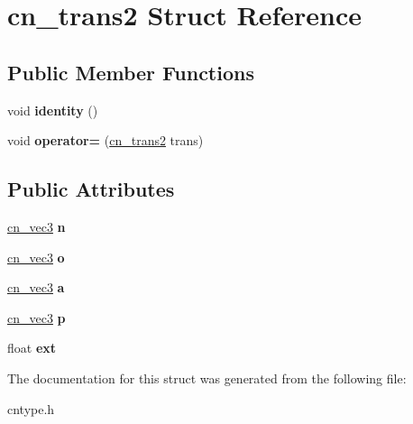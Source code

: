 \hypertarget{structcn__trans2}{\section{cn\-\_\-trans2 Struct Reference}
\label{structcn__trans2}
}
\subsection*{Public Member Functions}
\begin{DoxyCompactItemize}
\item 
\hypertarget{structcn__trans2_ab430e375eb0aa644ee7a2141deb4fdf3}{void {\bfseries identity} ()}\label{structcn__trans2_ab430e375eb0aa644ee7a2141deb4fdf3}

\item 
\hypertarget{structcn__trans2_a439c9767d8c3ece2bd5c3e2d0c3a66d1}{void {\bfseries operator=} (\hyperlink{structcn__trans2}{cn\-\_\-trans2} trans)}\label{structcn__trans2_a439c9767d8c3ece2bd5c3e2d0c3a66d1}

\end{DoxyCompactItemize}
\subsection*{Public Attributes}
\begin{DoxyCompactItemize}
\item 
\hypertarget{structcn__trans2_aab9125633d13ba361184f716a1a89d05}{\hyperlink{structcn__vec3}{cn\-\_\-vec3} {\bfseries n}}\label{structcn__trans2_aab9125633d13ba361184f716a1a89d05}

\item 
\hypertarget{structcn__trans2_a033f077851173cfc7b9e8518ec5ce1d3}{\hyperlink{structcn__vec3}{cn\-\_\-vec3} {\bfseries o}}\label{structcn__trans2_a033f077851173cfc7b9e8518ec5ce1d3}

\item 
\hypertarget{structcn__trans2_ad2a35be485837da5eded5eed7f114841}{\hyperlink{structcn__vec3}{cn\-\_\-vec3} {\bfseries a}}\label{structcn__trans2_ad2a35be485837da5eded5eed7f114841}

\item 
\hypertarget{structcn__trans2_af5270db31ffba46466e6e78c939309c3}{\hyperlink{structcn__vec3}{cn\-\_\-vec3} {\bfseries p}}\label{structcn__trans2_af5270db31ffba46466e6e78c939309c3}

\item 
\hypertarget{structcn__trans2_a6900755f644bc2671c3d5b27e66f5c64}{float {\bfseries ext}}\label{structcn__trans2_a6900755f644bc2671c3d5b27e66f5c64}

\end{DoxyCompactItemize}


The documentation for this struct was generated from the following file\-:\begin{DoxyCompactItemize}
\item 
cntype.\-h\end{DoxyCompactItemize}
